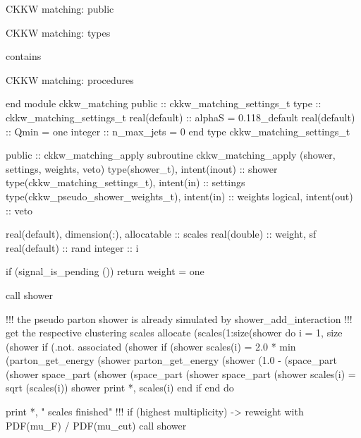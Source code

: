 \LA{}CKKW matching: public\RA{}

\LA{}CKKW matching: types\RA{}

contains

\LA{}CKKW matching: procedures\RA{}

end module ckkw_matching
\eatline
\nwendcode{}\nwdocspar
\nwenddocs{}\endmoddef
  public :: ckkw_matching_settings_t
\nwendcode{}\endmoddef
  type :: ckkw_matching_settings_t
     real(default) :: alphaS = 0.118_default
     real(default) :: Qmin = one
     integer :: n_max_jets = 0
  end type ckkw_matching_settings_t

\eatline
\nwendcode{}\nwdocspar
\nwenddocs{}\plusendmoddef
  public :: ckkw_matching_apply
\nwendcode{}\nwdocspar
\nwenddocs{}\endmoddef
  subroutine ckkw_matching_apply (shower, settings, weights, veto)
    type(shower_t), intent(inout) :: shower
    type(ckkw_matching_settings_t), intent(in) :: settings
    type(ckkw_pseudo_shower_weights_t), intent(in) :: weights
    logical, intent(out) :: veto

    real(default), dimension(:), allocatable :: scales
    real(double) :: weight, sf
    real(default) :: rand
    integer :: i

    if (signal_is_pending ()) return
    weight = one

    call shower%

    !!! the pseudo parton shower is already simulated by shower_add_interaction
    !!! get the respective clustering scales
    allocate (scales(1:size(shower%
    do i = 1, size (shower%
       if (.not. associated (shower%
       if (shower%
          scales(i) = 2.0 * min (parton_get_energy (shower%
               parton_get_energy (shower%
               (1.0 - (space_part (shower%
                space_part (shower%
               (space_part (shower%
                space_part (shower%
          scales(i) = sqrt (scales(i))
          shower%
          print *, scales(i)
       end if
    end do

    print *, " scales finished"
    !!! if (highest multiplicity) -> reweight with PDF(mu_F) / PDF(mu_cut)
    call shower%

